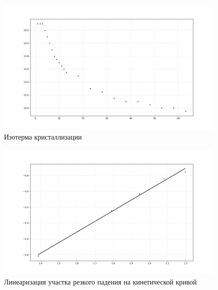 \documentclass[12pt]{article}
\begin{document}
\begin{figure}
	\includegraphics[width = \linewidth]{../isotherm.png}
	\caption{Изотерма кристаллизации}
\end{figure}

\begin{figure}
	\includegraphics[width = \linewidth]{../linear.png}
	\caption{Линеаризация участка резкого падения на кинетической кривой}
\end{figure}
\end{document}
